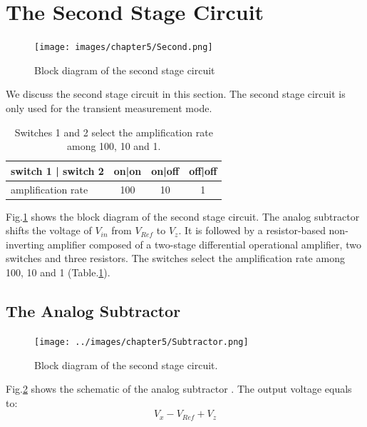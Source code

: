 {\FloatBarrier
\section{The Second Stage Circuit}
\FloatBarrier
\begin{figure}[!h]
    \centering
    \texttt{[image: images/chapter5/Second.png]}
    \caption{Block diagram of the second stage circuit}
    \label{fig:secondStage}
\end{figure}

We discuss the second stage circuit in this section.
The second stage circuit is only used for the transient measurement mode.



\begin{table}[!b]
    {\fontfamily{}\fontsize{10}{14}\selectfont
    \centering
    \begin{tabular}{l||c||c||c}
        switch 1 | switch 2 & on|on & on|off & off|off \\
        \hline
        amplification rate  & 100   & 10     & 1 \\
    \end{tabular}
    \caption{Switches 1 and 2 select the amplification rate among 100, 10 and 1.}
    \label{tb:AmpRate}
    }
\end{table}
Fig.\ref{fig:secondStage} shows the block diagram of the second stage circuit.
The analog subtractor shifts the voltage of $V_{in}$ from $V_{Ref}$ to $V_z$.
It is followed by a resistor-based non-inverting amplifier composed of a two-stage differential operational amplifier, two switches and three resistors.
The switches select the amplification rate among 100, 10 and 1 (Table.\ref{tb:AmpRate}).

\subsection{The Analog Subtractor} \label{sec:sub}

\begin{figure}[!htbp]
    \centering
        \texttt{[image: ../images/chapter5/Subtractor.png]}
    \caption{Block diagram of the second stage circuit.}
    \label{fig:subtractor}
\end{figure}

Fig.\ref{fig:subtractor} shows the schematic of the analog subtractor \cite{Tsubtractor}.
The output voltage equals to:
\begin{equation}
    V_x - V_{Ref} + V_z
\end{equation}

}
